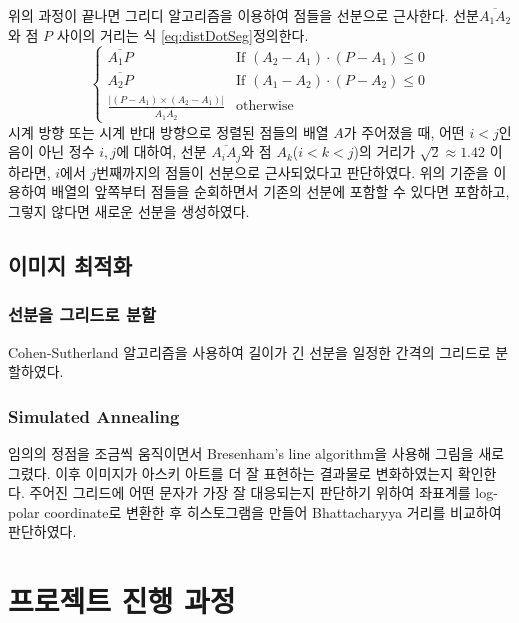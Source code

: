\documentclass[conference]{IEEEtran}
\begin{document}
위의 과정이 끝나면 그리디 알고리즘을 이용하여 점들을 선분으로 근사한다.
선분$\overline{A_1A_2}$와 점 $P$ 사이의 거리는 식 \ref{eq:distDotSeg}\로 정의한다.
\begin{equation}
    \begin{cases}
        \overline{A_1P} & \text{If } (A_2 - A_1) \cdot (P - A_1) \leq 0 \\
        \overline{A_2P} & \text{If } (A_1 - A_2) \cdot (P - A_2) \leq 0 \\
        \frac{|(P - A_1)\times (A_2 - A_1)|}{\overline{A_1A_2}} & \text{otherwise}
    \end{cases}
    \label{eq:distDotSeg}
\end{equation}
시계 방향 또는 시계 반대 방향으로 정렬된 점들의 배열 $A$가 주어졌을 때, 어떤 $i < j$인 음이 아닌 정수 $i, j$에 대하여,
선분 $\overline{A_iA_j}$와 점 $A_k$($i < k < j$)의 거리가 $\sqrt 2 \approx 1.42$ 이하라면, $i$에서 $j$번째까지의 점들이 선분으로 근사되었다고 판단하였다.
위의 기준을 이용하여 배열의 앞쪽부터 점들을 순회하면서 기존의 선분에 포함할 수 있다면 포함하고, 그렇지 않다면 새로운 선분을 생성하였다.

\subsection{이미지 최적화}

\subsubsection{선분을 그리드로 분할}
Cohen-Sutherland 알고리즘\cite{cohen-sutherland}을 사용하여 길이가 긴 선분을 일정한 간격의 그리드로 분할하였다.

\subsubsection{Simulated Annealing}
임의의 정점을 조금씩 움직이면서 Bresenham's line algorithm\cite{bresenham-line}을 사용해 그림을 새로 그렸다.
이후 이미지가 아스키 아트를 더 잘 표현하는 결과물로 변화하였는지 확인한다.
주어진 그리드에 어떤 문자가 가장 잘 대응되는지 판단하기 위하여 좌표계를 log-polar coordinate로 변환한 후 히스토그램을 만들어 Bhattacharyya 거리를 비교하여 판단하였다.\cite{st-ba-ascii-art}


\section{프로젝트 진행 과정}
\end{document}
